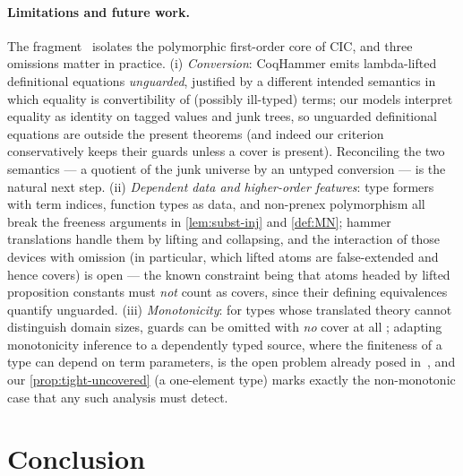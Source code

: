 \paragraph{Limitations and future work.}
The fragment \Frag\ isolates the polymorphic first-order core of CIC, and
three omissions matter in practice.  (i) \emph{Conversion}: CoqHammer
emits lambda-lifted definitional equations \emph{unguarded}, justified by
a different intended semantics in which equality is convertibility of
(possibly ill-typed) terms; our models interpret equality as identity on
tagged values and junk trees, so unguarded definitional equations are
outside the present theorems (and indeed our criterion conservatively
keeps their guards unless a cover is present).  Reconciling the two
semantics --- a quotient of the junk universe by an untyped conversion
--- is the natural next step.  (ii) \emph{Dependent data and higher-order
features}: type formers with term indices, function types as data, and
non-prenex polymorphism all break the freeness arguments in
\cref{lem:subst-inj} and \cref{def:MN}; hammer translations handle them
by lifting and collapsing, and the interaction of those devices with
omission (in particular, which lifted atoms are false-extended and hence
covers) is open --- the known constraint being that atoms headed by
lifted proposition constants must \emph{not} count as covers, since their
defining equivalences quantify unguarded.  (iii) \emph{Monotonicity}: for
types whose translated theory cannot distinguish domain sizes, guards can
be omitted with \emph{no} cover at all
\cite{ClaessenLilliestromSmallbone2011,BlanchetteBohmePopescuSmallbone2016};
adapting monotonicity inference to a dependently typed source, where the
finiteness of a type can depend on term parameters, is the open problem
already posed in~\cite{Czajka2018}, and our
\cref{prop:tight-uncovered} (a one-element type) marks exactly the
non-monotonic case that any such analysis must detect.

\section{Conclusion}
\label{sec:conclusion}

